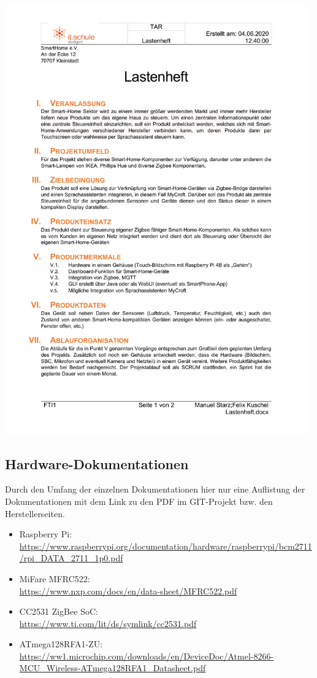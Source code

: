 \documentclass[12pt,a4paper]{article}
\begin{document}
 	\includegraphics[width=0.98\textwidth, page=2]{lastenheft.pdf}
 	\newpage
 	\subsection{Hardware-Dokumentationen}
 	Durch den Umfang der einzelnen Dokumentationen hier nur eine Auflistung der Dokumentationen mit dem Link zu den PDF im GIT-Projekt bzw. den Herstellerseiten.
 	\begin{itemize}
 		\item Raspberry Pi:\\ {\url{https://www.raspberrypi.org/documentation/hardware/raspberrypi/bcm2711/rpi_DATA_2711_1p0.pdf}}
 		\item MiFare MFRC522:\\ {\url{https://www.nxp.com/docs/en/data-sheet/MFRC522.pdf}}
 		\item CC2531 ZigBee SoC:\\ {\url{https://www.ti.com/lit/ds/symlink/cc2531.pdf}}
 		\item ATmega128RFA1-ZU:\\ {\url{https://ww1.microchip.com/downloads/en/DeviceDoc/Atmel-8266-MCU_Wireless-ATmega128RFA1_Datasheet.pdf}}
 	\end{itemize}
\end{document}
